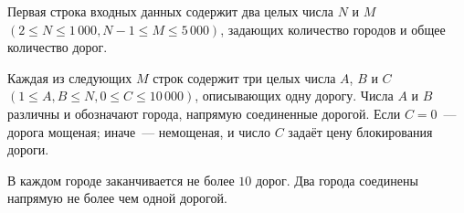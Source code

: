 Первая строка входных данных содержит два целых числа $N$ и $M$ $(2 \le N \le 1\,000, N - 1 \le M \le 5\,000)$, задающих количество городов и общее количество дорог. 

Каждая из следующих $M$ строк содержит три целых числа $A$, $B$ и $C$ $(1 \le A, B \le N, 0 \le C \le 10\,000)$, описывающих одну дорогу. Числа $A$ и $B$ различны и обозначают города, напрямую
соединенные дорогой. Если $C = 0$~--- дорога мощеная; иначе~--- немощеная, и число $C$ задаёт цену
блокирования дороги.

В каждом городе заканчивается не более $10$ дорог. Два города соединены напрямую не более чем одной
дорогой. 
